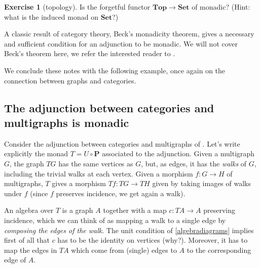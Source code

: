 \documentclass[12pt,oneside,headings=small]{scrbook}
\numberwithin{equation}{section}
\theoremstyle{plain}
\theoremstyle{definition}
\newtheorem{ex}[thm]{Exercise}
\newcommand{\cat}[1]{{\mathbf{#1}}} %
\DeclareMathOperator{\1}{\mathbbm{1}}
\DeclareMathOperator{\2}{\mathbbm{2}}
\begin{document}
\begin{ex}[topology]
 Is the forgetful functor $\cat{Top}\to\cat{Set}$ of  monadic? (Hint: what is the induced monad on $\cat{Set}$?)
\end{ex}



A classic result of category theory, Beck's monadicity theorem, gives a necessary and sufficient condition for an adjunction to be monadic. We will not cover Beck's theorem here, we refer the interested reader to \cite[Chapter~5]{ctcontext}. 

We conclude these notes with the following example, once again on the connection between graphs and categories.

\subsection{The adjunction between categories and multigraphs is monadic}\label{catgraphmonadic}

Consider the adjunction between categories and multigraphs of .
 Let's write explicitly the monad $T=U\circ\cat{P}$ associated to the adjunction. 
 Given a multigraph $G$, the graph $TG$ has the same vertices as $G$, but, as edges, it has the \emph{walks} of $G$, including the trivial walks at each vertex. Given a morphism $f:G\to H$ of multigraphs, $T$ gives a morphism $Tf:TG\to TH$ given by taking images of walks under $f$ (since $f$ preserves incidence, we get again a walk). 
 
 An algebra over $T$ is a graph $A$ together with a map $c:TA\to A$ preserving incidence, which we can think of as mapping a walk to a single edge by \emph{composing the edges of the walk}. The unit condition of \eqref{algebradiagrams} implies first of all that $c$ has to be the identity on vertices (why?). Moreover, it has to map the edges in $TA$ which come from (single) edges to $A$ to the corresponding edge of $A$.
 
\end{document}
